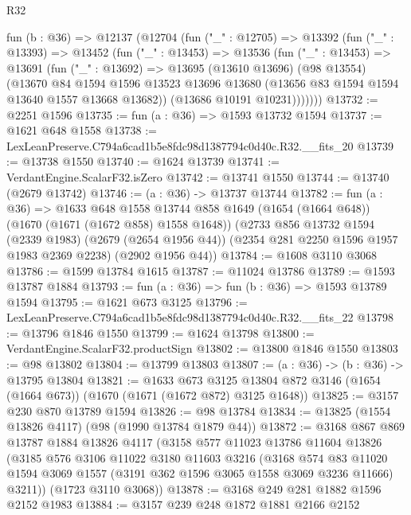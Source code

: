 \begin{lexlean}{R32}
\begin{coremodule}
  fun (b : @36) =>
  @12137
    (@12704
      (fun ("_" : @12705) =>
      @13392
        (fun ("_" : @13393) =>
        @13452
          (fun ("_" : @13453) =>
          @13536
            (fun ("_" : @13453) =>
            @13691
              (fun ("_" : @13692) =>
              @13695
                (@13610 @13696)
                (@98 @13554)
                (@13670
                  @84
                  @1594
                  @1596
                  @13523
                  @13696
                  @13680
                  (@13656 @83 @1594 @1594 @13640 @1557 @13668 @13682))
                (@13686 @10191 @10231)))))))
@13732 := @2251 @1596
@13735 := fun (a : @36) => @1593 @13732 @1594
@13737 := @1621 @648 @1558
@13738 := LexLeanPreserve.C794a6cad1b5e8fdc98d1387794c0d40c.R32.__fits_20
@13739 := @13738 @1550
@13740 := @1624 @13739
@13741 := VerdantEngine.ScalarF32.isZero
@13742 := @13741 @1550
@13744 := @13740 (@2679 @13742)
@13746 := (a : @36) -> @13737 @13744
@13782 := fun (a : @36) =>
  @1633
    @648
    @1558
    @13744
    @858
    @1649
    (@1654 (@1664 @648))
    (@1670 (@1671 (@1672 @858) @1558 @1648))
    (@2733
      @856
      @13732
      @1594
      (@2339 @1983)
      (@2679 (@2654 @1956 @44))
      (@2354 @281 @2250 @1596 @1957 @1983 @2369 @2238)
      (@2902 @1956 @44))
@13784 := @1608 @3110 @3068
@13786 := @1599 @13784 @1615
@13787 := @11024 @13786
@13789 := @1593 @13787 @1884
@13793 := fun (a : @36) => fun (b : @36) => @1593 @13789 @1594
@13795 := @1621 @673 @3125
@13796 := LexLeanPreserve.C794a6cad1b5e8fdc98d1387794c0d40c.R32.__fits_22
@13798 := @13796 @1846 @1550
@13799 := @1624 @13798
@13800 := VerdantEngine.ScalarF32.productSign
@13802 := @13800 @1846 @1550
@13803 := @98 @13802
@13804 := @13799 @13803
@13807 := (a : @36) -> (b : @36) -> @13795 @13804
@13821 := @1633
    @673
    @3125
    @13804
    @872
    @3146
    (@1654 (@1664 @673))
    (@1670 (@1671 (@1672 @872) @3125 @1648))
@13825 := @3157 @230 @870 @13789 @1594
@13826 := @98 @13784
@13834 := @13825 (@1554 @13826 @4117) (@98 (@1990 @13784 @1879 @44))
@13872 := @3168
    @867
    @869
    @13787
    @1884
    @13826
    @4117
    (@3158
      @577
      @11023
      @13786
      @11604
      @13826
      (@3185
        @576
        @3106
        @11022
        @3180
        @11603
        @3216
        (@3168
          @574
          @83
          @11020
          @1594
          @3069
          @1557
          (@3191 @362 @1596 @3065 @1558 @3069 @3236 @11666)
          @3211))
      (@1723 @3110 @3068))
@13878 := @3168 @249 @281 @1882 @1596 @2152 @1983
@13884 := @3157 @239 @248 @1872 @1881 @2166 @2152

\end{coremodule}
\end{lexlean}
